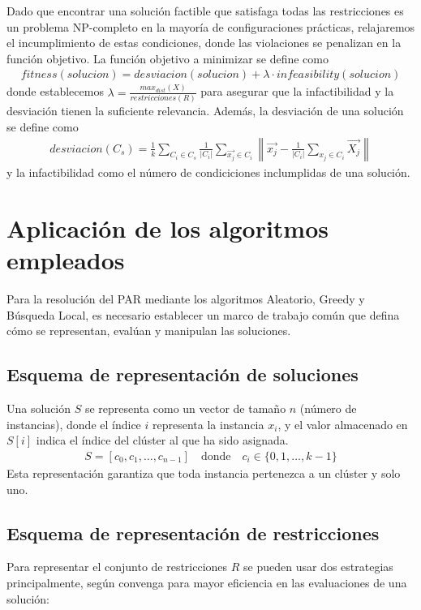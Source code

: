 \documentclass[12pt]{article}
\begin{document}
    Dado que encontrar una solución factible que satisfaga todas las restricciones es un problema NP-completo en la mayoría de configuraciones prácticas, relajaremos el incumplimiento de estas condiciones, donde las violaciones se penalizan en la función objetivo. La función objetivo a minimizar se define como
    \begin{gather*}
        fitness(solucion) = desviacion(solucion) + \lambda \cdot infeasibility(solucion)
    \end{gather*}
    donde establecemos $\lambda = \frac{max_ {dist}(X)}{restricciones(R)}$ para asegurar que la infactibilidad y la desviación tienen la suficiente relevancia. Además, la desviación de una solución se define como 
    \begin{gather*}
        desviacion(C_s) = \frac{1}{k} \sum_{C_i\in C_s} \frac{1}{|C_i|} \sum_{\vec{x_j}\in C_i} \left\|\vec{x_j} - \frac{1}{|C_i|} \sum_{x_j\in C_i} \vec{X_j}\right\|
    \end{gather*}
    y la infactibilidad como el número de condiciciones inclumplidas de una solución.

    \newpage

    \section{Aplicación de los algoritmos empleados}

    Para la resolución del PAR mediante los algoritmos Aleatorio, Greedy y Búsqueda Local, es necesario establecer un marco de trabajo común que defina cómo se representan, evalúan y manipulan las soluciones.

    \subsection{Esquema de representación de soluciones}
    Una solución $S$ se representa como un vector de tamaño $n$ (número de instancias), donde el índice $i$ representa la instancia $x_i$, y el valor almacenado en $S[i]$ indica el índice del clúster al que ha sido asignada.
    \begin{gather*}
        S = [c_0, c_1, \dots, c_{n-1}] \quad \text{donde} \quad c_i \in \{0,1, \dots, k-1\}
    \end{gather*}
    Esta representación garantiza que toda instancia pertenezca a un clúster y solo uno. 

    \subsection{Esquema de representación de restricciones}
    Para representar el conjunto de restricciones $R$ se pueden usar dos estrategias principalmente, según convenga para mayor eficiencia en las evaluaciones de una solución:
\end{document}
